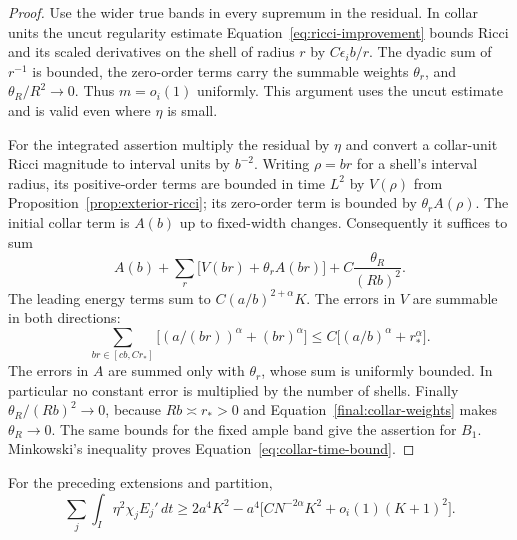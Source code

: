 \begin{proof}
Use the wider true bands in every supremum in the residual.  In collar
units the uncut regularity estimate
Equation~\eqref{eq:ricci-improvement} bounds Ricci and its scaled
derivatives on the shell of radius $r$ by $C\epsilon_i b/r$.
The dyadic sum of $r^{-1}$ is bounded, the zero-order terms carry the
summable weights $\theta_r$, and
$\theta_R/R^2\to0$.  Thus $m=o_i(1)$ uniformly.  This argument uses
the uncut estimate and is valid even where $\eta$ is small.

For the integrated assertion multiply the residual by $\eta$ and
convert a collar-unit Ricci magnitude to interval units by $b^{-2}$.
Writing $\rho=br$ for a shell's interval radius, its positive-order
terms are bounded in time $L^2$ by $V(\rho)$ from
Proposition~\ref{prop:exterior-ricci}; its zero-order term is bounded
by $\theta_r A(\rho)$.  The initial collar term is $A(b)$ up to
fixed-width changes.  Consequently it suffices to sum
\[
 A(b)+\sum_{r}\bigl[V(br)+\theta_r A(br)\bigr]
             +C\frac{\theta_R}{(Rb)^2}.
\]
The leading energy terms sum to $C(a/b)^{2+\alpha}K$.
The errors in $V$ are summable in both directions:
\[
 \sum_{br\in[cb,Cr_*]}
       \bigl[(a/(br))^\alpha+(br)^\alpha\bigr]
       \le C\bigl[(a/b)^\alpha+r_*^\alpha\bigr].
\]
The errors in $A$ are summed only with $\theta_r$, whose sum is
uniformly bounded.  In particular no constant error is multiplied
by the number of shells.  Finally
$\theta_R/(Rb)^2\to0$, because $Rb\asymp r_*>0$ and
Equation~\eqref{final:collar-weights} makes $\theta_R\to0$.
The same bounds for the fixed ample band give the assertion for
$B_1$.  Minkowski's inequality proves
Equation~\eqref{eq:collar-time-bound}.
\end{proof}

\begin{proposition}
\label{final:variation}
For the preceding extensions and partition,
\begin{equation}\label{eq:variation-lower}
 \sum_j\int_I\eta^2\chi_j E_j'\,dt
 \ge 2a^4K^2-a^4\bigl[CN^{-2\alpha}K^2
                              +o_i(1)(K+1)^2\bigr].
\end{equation}
\end{proposition}

